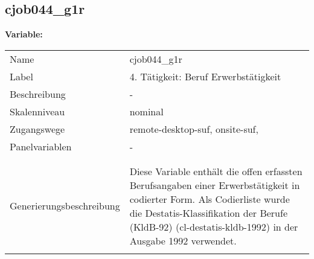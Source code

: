 	
	
	\subsection{cjob044\_g1r}
	\label{subSection:cjob044_g1r}

	\noindent\textbf{Variable:}\\
		\begin{tabular}{lL{11.3cm}}
			\label{tableVariable:cjob044_g1r}
			Name & cjob044\_g1r \\
			Label & 4. Tätigkeit: Beruf Erwerbstätigkeit \\
			Beschreibung & - \\
			Skalenniveau & nominal \\
			Zugangswege &
				remote-desktop-suf,
				onsite-suf,
 \\
			Panelvariablen & -
			 \\
			 \\
 \\
					Generierungsbeschreibung & Diese Variable enthält die offen erfassten Berufsangaben einer Erwerbstätigkeit in codierter Form. Als Codierliste wurde die Destatis-Klassifikation der Berufe (KldB-92) (cl-destatis-kldb-1992) in der Ausgabe 1992 verwendet. 
				 \\	
			 \\
		\end{tabular}






